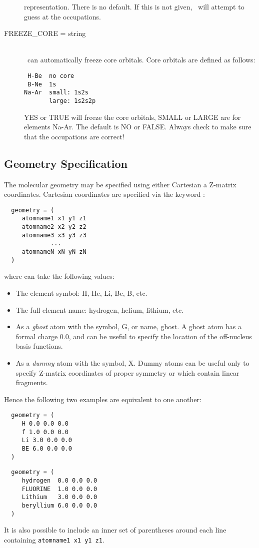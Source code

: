 \begin{description}
representation. There is no default.  If this is not given,
\PSIcscf\ will attempt to guess at the occupations.
\item[FREEZE\_CORE = string]\mbox{} \\
\PSIthree\ can automatically freeze core orbitals. Core orbitals are
defined as follows:  
\begin{verbatim}
 H-Be  no core 
 B-Ne  1s 
Na-Ar  small: 1s2s
       large: 1s2s2p
\end{verbatim}
YES or TRUE will freeze the core orbitals, SMALL or LARGE are for elements 
Na-Ar. The default is NO or FALSE. Always check to make sure that the 
occupations are correct!
\end{description}

\subsection{Geometry Specification} \label{geom-spec}
The molecular geometry may be specified using either Cartesian a
Z-matrix coordinates.  Cartesian coordinates are specified via the
keyword :
\begin{verbatim}
  geometry = (
     atomname1 x1 y1 z1 
     atomname2 x2 y2 z2 
     atomname3 x3 y3 z3 
             ...
     atomnameN xN yN zN 
  )
\end{verbatim}
where  can take the following values:
\begin{itemize}
\item The element symbol: H, He, Li, Be, B, etc.
\item The full element name: hydrogen, helium, lithium, etc.
\item As a {\em ghost} atom with the symbol, G, or name, ghost. A
ghost atom has a formal charge 0.0, and can be useful to specify the
location of the off-nucleus basis functions.
\item As a {\em dummy} atom with the symbol, X.  Dummy atoms can be
useful only to specify Z-matrix coordinates of proper symmetry or
which contain linear fragments.
\end{itemize}
Hence the following two examples are equivalent to one another:
\begin{verbatim}
  geometry = (
     H 0.0 0.0 0.0 
     f 1.0 0.0 0.0 
     Li 3.0 0.0 0.0 
     BE 6.0 0.0 0.0 
  )
\end{verbatim}
\begin{verbatim}
  geometry = (
     hydrogen  0.0 0.0 0.0 
     FLUORINE  1.0 0.0 0.0 
     Lithium   3.0 0.0 0.0 
     beryllium 6.0 0.0 0.0 
  )
\end{verbatim}
It is also possible to include an inner set 
of parentheses around each line containing {\tt atomname1 x1 y1 z1}.

